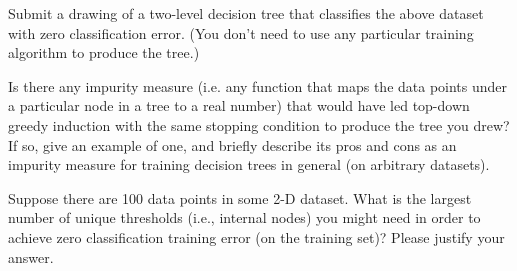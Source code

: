 \subproblem[5] Submit a drawing of a two-level decision tree that classifies the above dataset with zero classification error.  (You don't need to use any particular training algorithm to produce the tree.)

Is there any impurity measure (i.e. any function that maps the data points under a particular node in a tree to a real number) that would have led top-down greedy induction with the same stopping condition to produce the tree you drew?  If so, give an example of one, and briefly describe its pros and cons as an impurity measure for training decision trees in general (on arbitrary datasets). 

\subproblem[5] Suppose there are 100 data points in some 2-D dataset. What is the largest number of unique thresholds (i.e., internal nodes) you might need in order to achieve zero classification training error (on the training set)? Please
justify your answer.

